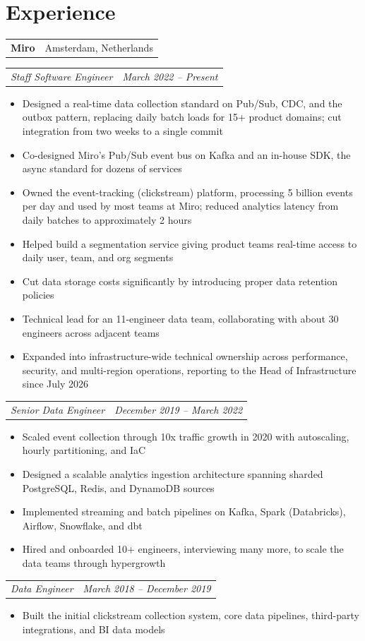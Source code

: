 \documentclass[a4paper,10pt]{article}
\makeatletter
\newcommand{\company}[2]{%
  \vspace{0.32em}%
  \noindent\begin{tabular*}{\textwidth}[t]{@{}l@{\extracolsep{\fill}}r@{}}%
    \textbf{#1} & #2 \\%
  \end{tabular*}%
  \par%
}
\newcommand{\position}[2]{%
  \vspace{0.12em}%
  \noindent\begin{tabular*}{\textwidth}[t]{@{}l@{\extracolsep{\fill}}r@{}}%
    \textit{#1} & \textit{#2} \\%
  \end{tabular*}%
  \par%
}
\makeatother
\begin{document}
\section{Experience}
\company{Miro}{Amsterdam, Netherlands}
\position{Staff Software Engineer}{March 2022 -- Present}
\begin{itemize}
  \item Designed a real-time data collection standard on Pub/Sub, CDC, and the outbox pattern, replacing daily batch loads for 15+ product domains; cut integration from two weeks to a single commit
  \item Co-designed Miro's Pub/Sub event bus on Kafka and an in-house SDK, the async standard for dozens of services
  \item Owned the event-tracking (clickstream) platform, processing 5 billion events per day and used by most teams at Miro; reduced analytics latency from daily batches to approximately 2 hours
  \item Helped build a segmentation service giving product teams real-time access to daily user, team, and org segments
  \item Cut data storage costs significantly by introducing proper data retention policies
  \item Technical lead for an 11-engineer data team, collaborating with about 30 engineers across adjacent teams
  \item Expanded into infrastructure-wide technical ownership across performance, security, and multi-region operations, reporting to the Head of Infrastructure since July 2026
\end{itemize}
\position{Senior Data Engineer}{December 2019 -- March 2022}
\begin{itemize}
  \item Scaled event collection through 10x traffic growth in 2020 with autoscaling, hourly partitioning, and IaC
  \item Designed a scalable analytics ingestion architecture spanning sharded PostgreSQL, Redis, and DynamoDB sources
  \item Implemented streaming and batch pipelines on Kafka, Spark (Databricks), Airflow, Snowflake, and dbt
  \item Hired and onboarded 10+ engineers, interviewing many more, to scale the data teams through hypergrowth
\end{itemize}
\position{Data Engineer}{March 2018 -- December 2019}
\begin{itemize}
  \item Built the initial clickstream collection system, core data pipelines, third-party integrations, and BI data models
\end{itemize}
\end{document}
